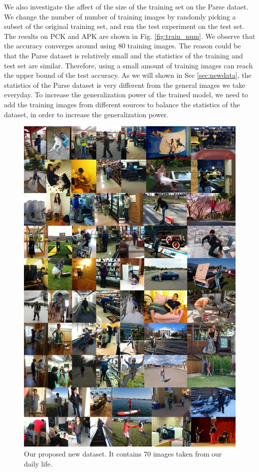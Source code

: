\documentclass[10pt,twocolumn,letterpaper]{article}
\begin{document}
We also investigate the affect of the size of the training set on the Parse dataet. We change the number of number of training images by randomly picking a subset of the original training set, and run the test experiment on the test set. The results on PCK and APK are shown in Fig. \ref{fig:train_num}. We observe that the accuracy converges around using 80 training images. The reason could be that the Parse dataset is relatively small and the statistics of the training and test set are similar. Therefore, using a small amount of training images can reach the upper bound of the test accuracy. As we will shown in Sec \ref{sec:newdata}, the statistics of the Parse dataset is very different from the general images we take everyday. To increase the generalization power of the trained model, we need to add the training images from different sources to balance the statistics of the dataset, in order to increase the generalization power.

\begin{figure}[t]
  \center
  \includegraphics[width=0.9\linewidth]{figure/newdata.jpg}
  \caption{Our proposed new dataset. It contains 70 images taken from our daily life.}
  \label{fig:newdata}
\end{figure}
\end{document}
